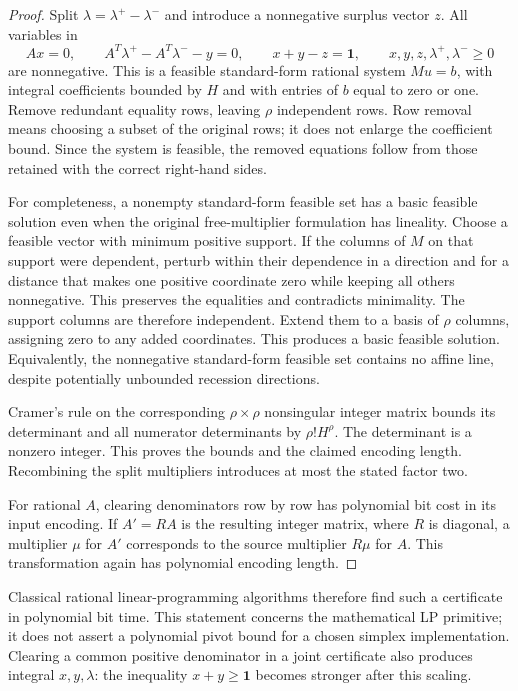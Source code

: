 \begin{proof}
Split $\lambda=\lambda^+-\lambda^-$ and introduce a nonnegative surplus
vector $z$.  All variables in
\[
 Ax=0,\qquad A^T\lambda^+-A^T\lambda^- - y=0,
 \qquad x+y-z=\mathbf1,
 \qquad x,y,z,\lambda^+,\lambda^-\geq0
\]
are nonnegative.  This is a feasible standard-form rational system
$Mu=b$, with integral coefficients bounded by $H$ and with entries of
$b$ equal to zero or one.  Remove redundant equality rows, leaving
$\rho$ independent rows.  Row removal means choosing a subset of the
original rows; it does not enlarge the coefficient bound.  Since the
system is feasible, the removed equations follow from those retained
with the correct right-hand sides.

For completeness, a nonempty standard-form feasible set has a basic
feasible solution even when the original free-multiplier formulation
has lineality.  Choose a feasible vector with minimum positive support.
If the columns of $M$ on that support were dependent, perturb within
their dependence in a direction and for a distance that makes one
positive coordinate zero while keeping all others nonnegative.  This
preserves the equalities and contradicts minimality.  The support
columns are therefore independent.  Extend them to a basis of $\rho$
columns, assigning zero to any added coordinates.  This produces a
basic feasible solution.  Equivalently, the nonnegative standard-form
feasible set contains no affine line, despite potentially unbounded
recession directions.

Cramer's rule on the corresponding $\rho\times\rho$ nonsingular
integer matrix bounds its determinant and all numerator determinants
by $\rho!H^\rho$.  The determinant is a nonzero integer.  This proves
the bounds and the claimed encoding length.  Recombining the split
multipliers introduces at most the stated factor two.

For rational $A$, clearing denominators row by row has polynomial bit
cost in its input encoding.  If $A'=RA$ is the resulting integer matrix,
where $R$ is diagonal, a multiplier $\mu$ for $A'$ corresponds to the
source multiplier $R\mu$ for $A$.  This transformation again has
polynomial encoding length.
\end{proof}

Classical rational linear-programming algorithms therefore find such a
certificate in polynomial bit time.  This statement concerns the
mathematical LP primitive; it does not assert a polynomial pivot bound
for a chosen simplex implementation.  Clearing a common positive
denominator in a joint certificate also produces integral $x,y,\lambda$:
the inequality $x+y\geq\mathbf1$ becomes stronger after this scaling.

